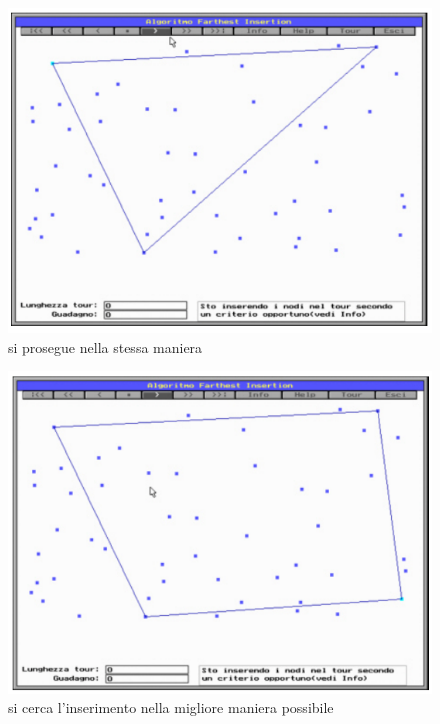 \documentclass{article}
\begin{document}
    \begin{figure}[H]
        \centering
        \includegraphics[scale=0.5]{images/farthest1.png}
        \caption{si prosegue nella stessa maniera}
    \end{figure}

    \begin{figure}[H]
        \centering
        \includegraphics[scale=0.5]{images/farthest2.png}
        \caption{si cerca l'inserimento nella migliore maniera possibile}
    \end{figure}
\end{document}
